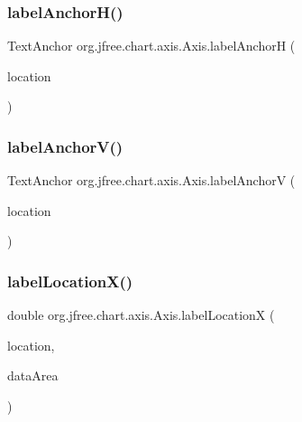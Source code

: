 \subsubsection{\texorpdfstring{label\+Anchor\+H()}{labelAnchorH()}}
{\footnotesize\ttfamily Text\+Anchor org.\+jfree.\+chart.\+axis.\+Axis.\+label\+AnchorH (\begin{DoxyParamCaption}\item[{\mbox{\hyperlink{classorg_1_1jfree_1_1chart_1_1axis_1_1_axis_label_location}{Axis\+Label\+Location}}}]{location }\end{DoxyParamCaption})\hspace{0.3cm}{\ttfamily [protected]}}

\mbox{\label{classorg_1_1jfree_1_1chart_1_1axis_1_1_axis_aa493df3b8a59065a2216c3e2d517ee05}} 
\subsubsection{\texorpdfstring{label\+Anchor\+V()}{labelAnchorV()}}
{\footnotesize\ttfamily Text\+Anchor org.\+jfree.\+chart.\+axis.\+Axis.\+label\+AnchorV (\begin{DoxyParamCaption}\item[{\mbox{\hyperlink{classorg_1_1jfree_1_1chart_1_1axis_1_1_axis_label_location}{Axis\+Label\+Location}}}]{location }\end{DoxyParamCaption})\hspace{0.3cm}{\ttfamily [protected]}}

\mbox{\label{classorg_1_1jfree_1_1chart_1_1axis_1_1_axis_a782bb1fd0455477d582252857ca969a7}} 
\subsubsection{\texorpdfstring{label\+Location\+X()}{labelLocationX()}}
{\footnotesize\ttfamily double org.\+jfree.\+chart.\+axis.\+Axis.\+label\+LocationX (\begin{DoxyParamCaption}\item[{\mbox{\hyperlink{classorg_1_1jfree_1_1chart_1_1axis_1_1_axis_label_location}{Axis\+Label\+Location}}}]{location,  }\item[{Rectangle2D}]{data\+Area }\end{DoxyParamCaption})\hspace{0.3cm}{\ttfamily [protected]}}

